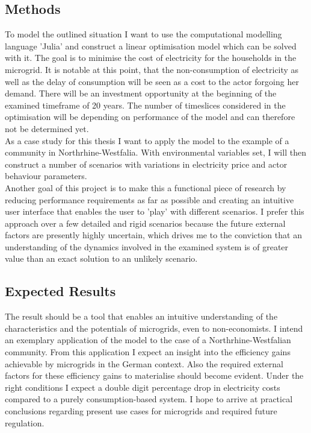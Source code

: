 \documentclass[
	11pt,								%
	DIV10,								%
	a4paper,         					%
	oneside,							%
	headheight=20pt,					%
	footheight=20pt,					%
    parskip=full,						%
    listof=totoc,						%
	bibliography=totoc,					%
	index=totoc,						%
]{scrartcl}
\begin{document}
\subsection{Methods}
	To model the outlined situation I want to use the computational modelling language 'Julia' and construct a linear optimisation model which can be solved with it. The goal is to minimise the cost of electricity for the households in the microgrid. It is notable at this point, that the non-consumption of electricity as well as the delay of consumption will be seen as a cost to the actor forgoing her demand. There will be an investment opportunity at the beginning of the examined timeframe of 20 years. The number of timeslices considered in the optimisation will be depending on performance of the model and can therefore not be determined yet. \\
	As a case study for this thesis I want to apply the model to the example of a community in Northrhine-Westfalia. With environmental variables set, I will then construct a number of scenarios with variations in electricity price and actor behaviour parameters. \\
	Another goal of this project is to make this a functional piece of research by reducing performance requirements as far as possible and creating an intuitive user interface that enables the user to 'play' with different scenarios. I prefer this approach over a few detailed and rigid scenarios because the future external factors are presently highly uncertain, which drives me to the conviction that an understanding of the dynamics involved in the examined system is of greater value than an exact solution to an unlikely scenario.
	
\subsection{Expected Results}
The result should be a tool that enables an intuitive understanding of the characteristics and the potentials of microgrids, even to non-economists. I intend an exemplary application of the model to the case of a Northrhine-Westfalian community. From this application I expect an insight into the efficiency gains achievable by microgrids in the German context. Also the required external factors for these efficiency gains to materialise should become evident. Under the right conditions I expect a double digit percentage drop in electricity costs compared to a purely consumption-based system. I hope to arrive at practical conclusions regarding present use cases for microgrids and required future regulation.
\newpage
\end{document}

